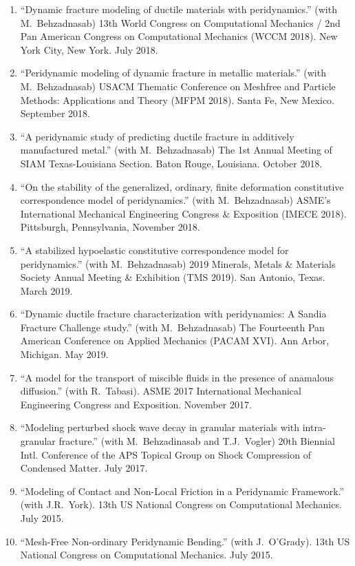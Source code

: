 \begin{etaremune}
\else
\begin{enumerate}
\fi
  \item ``Dynamic fracture modeling of ductile materials with peridynamics.'' (with M.\ Behzadnasab) 13th World Congress on Computational Mechanics / 2nd Pan American Congress on Computational Mechanics (WCCM 2018). New York City, New York. July 2018.
  \item ``Peridynamic modeling of dynamic fracture in metallic materials.'' (with M.\ Behzadnasab) USACM Thematic Conference on Meshfree and Particle Methods: Applications and Theory (MFPM 2018). Santa Fe, New Mexico. September 2018.
  \item ``A peridynamic study of predicting ductile fracture in additively manufactured metal.'' (with M.\ Behzadnasab) The 1st Annual Meeting of SIAM Texas-Louisiana Section. Baton Rouge, Louisiana. October 2018. 
  \item ``On the stability of the generalized, ordinary, finite deformation constitutive correspondence model of peridynamics.'' (with M.\ Behzadnasab) ASME's International Mechanical Engineering Congress \& Exposition (IMECE 2018). Pittsburgh, Pennsylvania, November 2018.
  \item ``A stabilized hypoelastic constitutive correspondence model for peridynamics.'' (with M.\ Behzadnasab) 2019 Minerals, Metals \& Materials Society Annual Meeting \& Exhibition (TMS 2019). San Antonio, Texas. March 2019.
  \item ``Dynamic ductile fracture characterization with peridynamics: A Sandia Fracture Challenge study.'' (with M.\ Behzadnasab) The Fourteenth Pan American Conference on Applied Mechanics (PACAM XVI). Ann Arbor, Michigan. May 2019.
  \item ``A model for the transport of miscible fluids in the presence of anamalous diffusion.'' (with R.\ Tabasi).  ASME 2017 International Mechanical Engineering Congress and Exposition. November 2017.
  \item ``Modeling perturbed shock wave decay in granular materials with intra-granular fracture.'' (with M.\ Behzadinasab and T.J.\ Vogler) 20th Biennial Intl. Conference of the APS Topical Group on Shock Compression of Condensed Matter. July 2017.
  \item ``Modeling of Contact and Non-Local Friction in a Peridynamic Framework.'' (with J.R.~York). 13th US National Congress on Computational Mechanics. July 2015.
  \item ``Mesh-Free Non-ordinary Peridynamic Bending.'' (with J.~O'Grady). 13th US National Congress on Computational Mechanics. July 2015.

\end{enumerate}
\end{etaremune}
